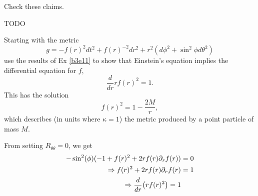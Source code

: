 \documentclass[10pt]{article}
\begin{document}
\begin{example}
	Check these claims.
\end{example}
\sol TODO


\begin{example}
	Starting with the metric
	$$
	g=-f(r)^2dt^2+f(r)^{-2}dr^2+r^2(d\phi^2+\sin^2\phi d\theta^2)
	$$
	use the results of Ex \ref{b3e11} to show that Einstein's equation implies the differential equation for $f$,
	$$
	\frac{d}{dr}rf(r)^2=1.
	$$
	This has the solution
	$$
	f(r)^2=1-\frac{2M}{r},
	$$
	which describes (in units where $\kappa=1$) the metric produced by a point particle of mass $M$.
\end{example}
\sol From setting $R_{\theta\theta} = 0$, we get
$$
\begin{aligned}
	-\sin^2(\phi)(-1+f(r)^2+2rf(r)\partial_rf(r))&=0\\
	\Rightarrow f(r)^2+2rf(r)\partial_rf(r)&=1\\
	\Rightarrow \frac{d}{dr}\p*{rf(r)^2}=1
\end{aligned}
$$
\end{document}
